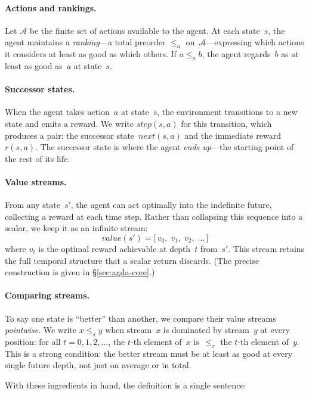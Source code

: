 \documentclass[9pt,a4paper]{article}
\theoremstyle{plain}
\theoremstyle{definition}
\theoremstyle{remark}
\begin{document}
\paragraph{Actions and rankings.}
Let $\mathcal{A}$ be the finite set of actions available to the agent.
At each state~$s$, the agent maintains a \emph{ranking}---a total preorder $\le_a$ on~$\mathcal{A}$---expressing which actions it considers at least as good as which others.
If $a \le_a b$, the agent regards~$b$ as at least as good as~$a$ at state~$s$.

\paragraph{Successor states.}
When the agent takes action~$a$ at state~$s$, the environment transitions to a new state and emits a reward.
We write $\mathit{step}(s,a)$ for this transition, which produces a pair: the successor state~$\mathit{next}(s,a)$ and the immediate reward~$r(s,a)$.
The successor state is where the agent \emph{ends up}---the starting point of the rest of its life.

\paragraph{Value streams.}
From any state~$s'$, the agent can act optimally into the indefinite future, collecting a reward at each time step.
Rather than collapsing this sequence into a scalar, we keep it as an infinite stream:
\[
\mathit{value}(s') = \bigl[\, v_0,\; v_1,\; v_2,\; \ldots \,\bigr]
\]
where $v_t$ is the optimal reward achievable at depth~$t$ from~$s'$.
This stream retains the full temporal structure that a scalar return discards.
(The precise construction is given in \S\ref{sec:agda-core}.)

\paragraph{Comparing streams.}
To say one state is ``better'' than another, we compare their value streams \emph{pointwise}.
We write $x \le_s y$ when stream~$x$ is dominated by stream~$y$ at every position: for all $t = 0, 1, 2, \ldots$, the $t$-th element of~$x$ is~$\le_r$ the $t$-th element of~$y$.
This is a strong condition: the better stream must be at least as good at every single future depth, not just on average or in total.

\medskip

With these ingredients in hand, the definition is a single sentence:
\end{document}
